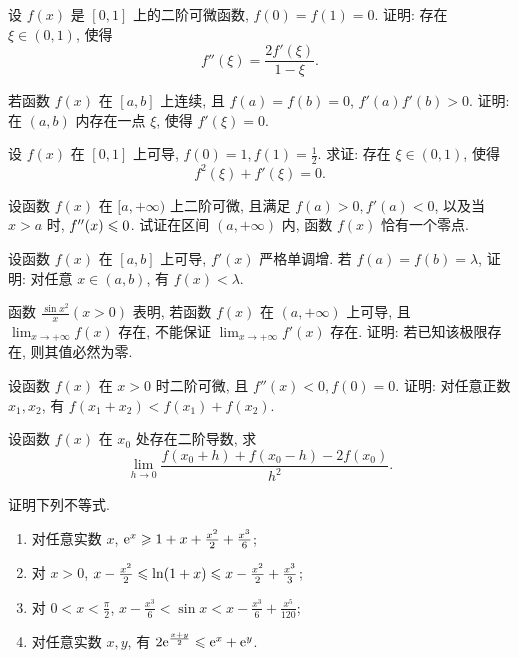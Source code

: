 \begin{exercise}[3.C.6]
    设 $f(x)$ 是 $[0, 1]$ 上的二阶可微函数, $f(0) = f(1) = 0$. 证明: 存在 $\xi \in (0, 1)$, 使得
    $$f''(\xi) = \frac{2 f'(\xi)}{1 - \xi}.$$
\end{exercise}

\begin{exercise}[3.C.7]
    若函数 $f(x)$ 在 $[a, b]$ 上连续, 且 $f(a) = f(b) = 0$, $f'(a)f'(b) > 0$. 证明: 在 $(a, b)$ 内存在一点 $\xi$, 使得 $f'(\xi) = 0$.
\end{exercise}

\begin{exercise}[3.C.8]
    设 $f(x)$ 在 $[0, 1]$ 上可导, $f(0) = 1, f(1) = \frac{1}{2}$. 求证: 存在 $\xi \in (0, 1)$, 使得
    $$f^2(\xi) + f'(\xi) = 0.$$
\end{exercise}

\begin{exercise}[3.C.9]
    设函数 $f(x)$ 在 $[a, +\infty)$ 上二阶可微, 且满足 $f(a) > 0, f'(a) < 0$, 以及当 $x > a$ 时, $f''(x) \leqslant 0$. 试证在区间 $(a, +\infty)$ 内, 函数 $f(x)$ 恰有一个零点.
\end{exercise}

\begin{exercise}[3.C.10]
    设函数 $f(x)$ 在 $[a, b]$ 上可导, $f'(x)$ 严格单调增. 若 $f(a) = f(b) = \lambda$, 证明: 对任意 $x \in (a, b)$, 有 $f(x) < \lambda$.
\end{exercise}

\begin{exercise}[3.C.11]
    函数 $\frac{\sin x^2}{x} (x > 0)$ 表明, 若函数 $f(x)$ 在 $(a, +\infty)$ 上可导, 且 $\lim_{x \to +\infty} f(x)$ 存在, 不能保证 $\lim_{x \to +\infty} f'(x)$ 存在. 证明: 若已知该极限存在, 则其值必然为零.
\end{exercise}

\begin{exercise}[3.C.12]
    设函数 $f(x)$ 在 $x > 0$ 时二阶可微, 且 $f''(x) < 0, f(0) = 0$. 证明: 对任意正数 $x_1, x_2$, 有 $f(x_1 + x_2) < f(x_1) + f(x_2)$.
\end{exercise}

\begin{exercise}[3.C.13]
    设函数 $f(x)$ 在 $x_0$ 处存在二阶导数, 求
    $$\lim_{h \to 0} \frac{f(x_0 + h) + f(x_0 - h) - 2f(x_0)}{h^2}.$$
\end{exercise}

\begin{exercise}[3.C.14]
    证明下列不等式.
    \begin{enumerate}
        \item 对任意实数 $x$, $\mathrm{e}^x \geqslant 1 + x + \frac{x^2}{2} + \frac{x^3}{6}$;
        \item 对 $x > 0$, $x - \frac{x^2}{2} \leqslant \ln(1 + x) \leqslant x - \frac{x^2}{2} + \frac{x^3}{3}$;
        \item 对 $0 < x < \frac{\pi}{2}$, $x - \frac{x^3}{6} < \sin x < x - \frac{x^3}{6} + \frac{x^5}{120}$;
        \item 对任意实数 $x, y$, 有 $2 \mathrm{e}^{\frac{x+y}{2}} \leqslant \mathrm{e}^x + \mathrm{e}^y$.
    \end{enumerate}
\end{exercise}

